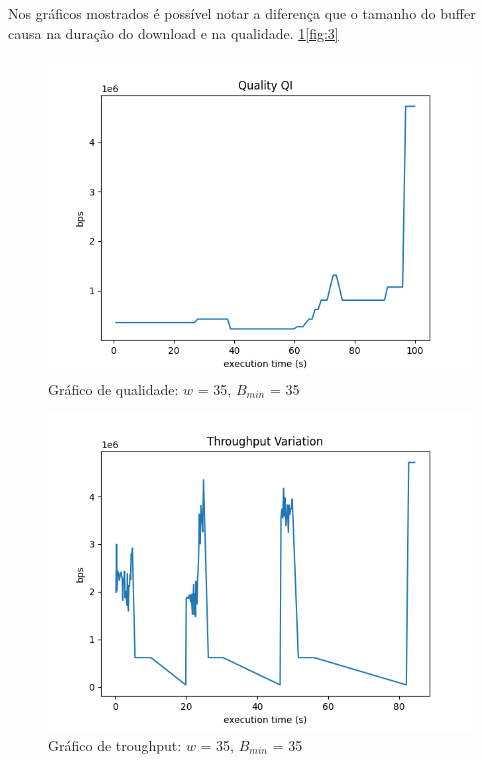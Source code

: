 \documentclass[10pt,twocolumn,letterpaper]{article}
\begin{document}
	Nos gráficos mostrados é possível notar a diferença que o tamanho do buffer causa na duração do download e na qualidade. \ref{fig:1}\ref{fig:3}
	\begin{figure}
		\centering
		\includegraphics[width=\linewidth]{0.35 - 35 - qual.png}
		\caption{Gráfico de qualidade: $w$ = 35, $B_{min}$ = 35}
		\label{fig:1}
	\end{figure}
	\begin{figure}
		\centering
		\includegraphics[width=\linewidth]{0.358 -35 -throughput.png}
		\caption{Gráfico de troughput: $w$ = 35, $B_{min}$ = 35}
		\label{fig:2}
	\end{figure}
\end{document}
